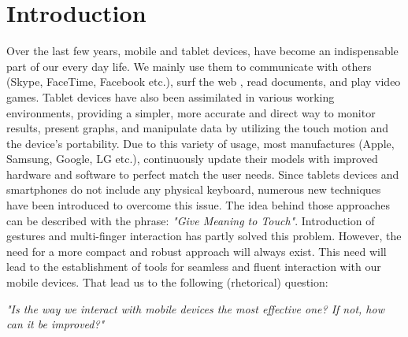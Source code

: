 \section{Introduction}
Over the last few years, mobile and tablet devices, have become an indispensable part of our every day life. 
We mainly use them to communicate with others (Skype, FaceTime, Facebook etc.), surf the web \cite{www}, read documents, and play video games. 
Tablet devices have also been assimilated in various working environments, providing a simpler, more accurate and direct way to monitor results, present graphs, and manipulate data by utilizing the touch motion and the device's portability.
Due to this variety of usage, most manufactures (Apple, Samsung, Google, LG etc.), continuously update their models with improved hardware and software to perfect match the user needs.
Since tablets devices and smartphones do not include any physical keyboard, numerous new techniques have been introduced to overcome this issue. The idea behind those approaches can be described with the phrase: \emph{"Give Meaning to Touch"}. Introduction of gestures and multi-finger interaction \cite{multiTouch} has partly solved this problem. However, the need for a more compact and robust approach will always exist. This need will lead to the establishment of tools for seamless and fluent interaction with our mobile devices. That lead us to the following (rhetorical) question:

\emph{"Is the way we interact with mobile devices the most effective one? If not, how can it be improved?"}

